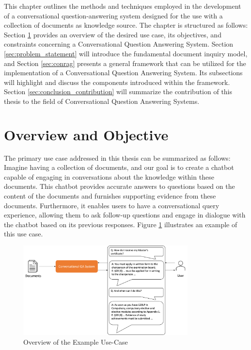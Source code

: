 This chapter outlines the methods and techniques employed in the development of a conversational question-answering system designed for the use with a collection of documents as knowledge source. The chapter is structured as follows: Section \ref{sec:overview} provides an overview of the desired use case, its objectives, and constraints concerning a Conversational Question Answering System. Section \ref{sec:problem_statement} will introduce the fundamental document inquiry model, and Section \ref{sec:conrag} presents a general framework that can be utilized for the implementation of a Conversational Question Answering System. Its subsections will highlight and discuss the components introduced within the framework. Section \ref{sec:conclusion_contribution} will summarize the contribution of this thesis to the field of Conversational Question Answering Systems.


\section{Overview and Objective}
\label{sec:overview}

The primary use case addressed in this thesis can be summarized as follows: Imagine having a collection of documents, and our goal is to create a chatbot capable of engaging in conversations about the knowledge within these documents. This chatbot provides accurate answers to questions based on the content of the documents and furnishes supporting evidence from these documents. Furthermore, it enables users to have a conversational query experience, allowing them to ask follow-up questions and engage in dialogue with the chatbot based on its previous responses. Figure \ref{fig:use-case} illustrates an example of this use case.

\begin{figure}
    \centering
    \includegraphics[width=0.8\textwidth]{Grafiken/Use_Case.png}
    \caption{Overview of the Example Use-Case}
    \label{fig:use-case}
\end{figure}


